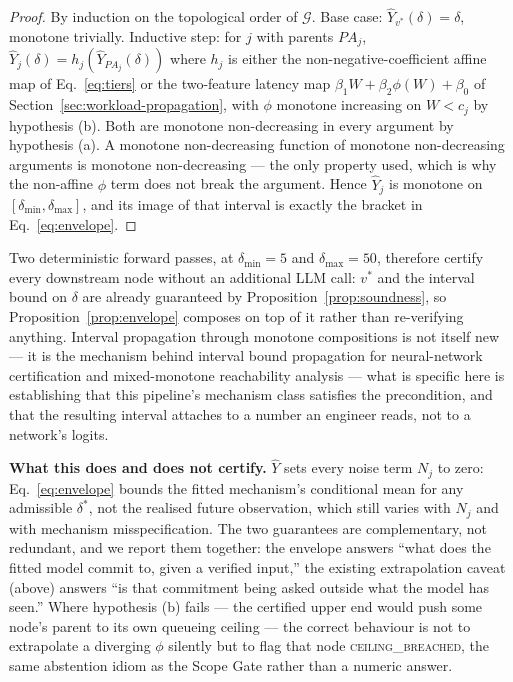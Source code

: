 \documentclass[journal, 10pt]{IEEEtran}
\begin{document}
\begin{proof}
By induction on the topological order of $\mathcal{G}$. Base case:
$\hat{Y}_{v^*}(\delta)=\delta$, monotone trivially. Inductive step: for $j$ with
parents $PA_j$, $\hat{Y}_j(\delta)=h_j(\hat{Y}_{PA_j}(\delta))$ where $h_j$ is
either the non-negative-coefficient affine map of Eq.~\eqref{eq:tiers} or the
two-feature latency map $\beta_1 W+\beta_2\phi(W)+\beta_0$ of
Section~\ref{sec:workload-propagation}, with $\phi$ monotone increasing on
$W<c_j$ by hypothesis (b). Both are monotone non-decreasing in every argument by
hypothesis (a). A monotone non-decreasing function of monotone non-decreasing
arguments is monotone non-decreasing --- the only property used, which is why
the non-affine $\phi$ term does not break the argument. Hence $\hat{Y}_j$ is
monotone on $[\delta_{\min},\delta_{\max}]$, and its image of that interval is
exactly the bracket in Eq.~\eqref{eq:envelope}.
\end{proof}

Two deterministic forward passes, at $\delta_{\min}=5$ and $\delta_{\max}=50$,
therefore certify every downstream node without an additional LLM call: $v^*$
and the interval bound on $\delta$ are already guaranteed by
Proposition~\ref{prop:soundness}, so Proposition~\ref{prop:envelope} composes on
top of it rather than re-verifying anything. Interval propagation through
monotone compositions is not itself new --- it is the mechanism behind interval
bound propagation for neural-network certification \cite{gowal2018ibp} and
mixed-monotone reachability analysis \cite{angeli2003mixed} --- what is specific
here is establishing that this pipeline's mechanism class satisfies the
precondition, and that the resulting interval attaches to a number an engineer
reads, not to a network's logits.

\textbf{What this does and does not certify.} $\hat{Y}$ sets every noise term
$N_j$ to zero: Eq.~\eqref{eq:envelope} bounds the fitted mechanism's conditional
mean for any admissible $\delta^*$, not the realised future observation, which
still varies with $N_j$ and with mechanism misspecification. The two guarantees
are complementary, not redundant, and we report them together: the envelope
answers ``what does the fitted model commit to, given a verified input,'' the
existing extrapolation caveat (above) answers ``is that commitment being asked
outside what the model has seen.'' Where hypothesis (b) fails --- the certified
upper end would push some node's parent to its own queueing ceiling --- the
correct behaviour is not to extrapolate a diverging $\phi$ silently but to flag
that node \textsc{ceiling\_breached}, the same abstention idiom as the Scope
Gate rather than a numeric answer.
\end{document}
